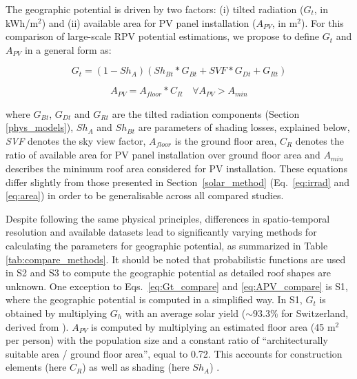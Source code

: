 The geographic potential is driven by two factors: (i) tilted radiation ($G_t$, in kWh/m$^2$) and (ii) available area for PV panel installation ($A_{PV}$, in m$^2$). For this comparison of large-scale RPV potential estimations, we propose to define $G_t$ and $A_{PV}$ in a general form as:

\begin{equation}
\label{eq:Gt_compare}
    G_t = (1 - Sh_A) (Sh_{Bt} * G_{Bt} + \mathit{SVF} * G_{Dt} + G_{Rt})
\end{equation}

\begin{equation}
\label{eq:APV_compare}
    A_{PV} = A_{\mathit{floor}} * C_R \quad \forall A_{PV} > A_{min} 
\end{equation}

where $G_{Bt}$, $G_{Dt}$ and $G_{Rt}$ are the tilted radiation components (Section \ref{phys_models}), $Sh_A$ and $Sh_{Bt}$ are parameters of shading losses, explained below, \textit{SVF} denotes the sky view factor, $A_{\mathit{floor}}$ is the ground floor area, $C_R$ denotes the ratio of available area for PV panel installation over ground floor area and $A_{min}$ describes the minimum roof area considered for PV installation. 
These equations differ slightly from those presented in Section~\ref{solar_method} (Eq.~\ref{eq:irrad} and \ref{eq:area}) in order to be generalisable across all compared studies. 

Despite following the same physical principles, differences in spatio-temporal resolution and available datasets lead to significantly varying methods for calculating the parameters for geographic potential, as summarized in Table \ref{tab:compare_methods}. It should be noted that probabilistic functions are used in S2 and S3 to compute the geographic potential as detailed roof shapes are unknown. One exception to Eqs.~\ref{eq:Gt_compare} and \ref{eq:APV_compare} is S1, where the geographic potential is computed in a simplified way. In S1, $G_t$ is obtained by multiplying $G_h$ with an average solar yield ($\sim 93.3\%$ for Switzerland, derived from \cite{iea_potential_2002}). $A_{PV}$ is computed by multiplying an estimated floor area (45 m$^2$ per person) with the population size and a constant ratio of “architecturally suitable area / ground floor area”, equal to 0.72. This accounts for construction elements (here $C_R$) as well as shading (here $Sh_A$) \cite{iea_potential_2002}.

